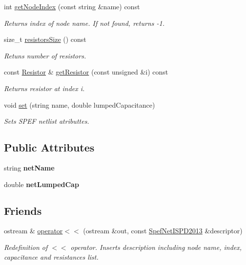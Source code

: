 \begin{DoxyCompactItemize}
int \hyperlink{classSpefNetISPD2013_aa5143da0b98e3fa1613562061238f4ee}{get\-Node\-Index} (const string \&name) const 
\begin{DoxyCompactList}\small\item\em Returns index of node name. If not found, returns -\/1. \end{DoxyCompactList}\item 
size\-\_\-t \hyperlink{classSpefNetISPD2013_a1a15314aec6fae289f90b9e7de201fe8}{resistors\-Size} () const 
\begin{DoxyCompactList}\small\item\em Retuns number of resistors. \end{DoxyCompactList}\item 
const \hyperlink{structSpefNetISPD2013_1_1Resistor}{Resistor} \& \hyperlink{classSpefNetISPD2013_a1baa70cdf4b2c65a7e695849c2ad2525}{get\-Resistor} (const unsigned \&i) const 
\begin{DoxyCompactList}\small\item\em Returns resistor at index i. \end{DoxyCompactList}\item 
void \hyperlink{classSpefNetISPD2013_a3a0ed208b150100bda0544112fb1c0ba}{set} (string name, double lumped\-Capacitance)
\begin{DoxyCompactList}\small\item\em Sets S\-P\-E\-F netlist atributtes. \end{DoxyCompactList}\end{DoxyCompactItemize}
\subsection*{Public Attributes}
\begin{DoxyCompactItemize}
\item 
\hypertarget{classSpefNetISPD2013_a1aa3f32d0cac9a7b1800ab67903361fa}{string {\bfseries net\-Name}}\label{classSpefNetISPD2013_a1aa3f32d0cac9a7b1800ab67903361fa}

\item 
\hypertarget{classSpefNetISPD2013_af088c8d7cbca748a4a56ab796ccb2fd5}{double {\bfseries net\-Lumped\-Cap}}\label{classSpefNetISPD2013_af088c8d7cbca748a4a56ab796ccb2fd5}

\end{DoxyCompactItemize}
\subsection*{Friends}
\begin{DoxyCompactItemize}
\item 
ostream \& \hyperlink{classSpefNetISPD2013_a6a52417a5250abf94d511910add3415e}{operator$<$$<$} (ostream \&out, const \hyperlink{classSpefNetISPD2013}{Spef\-Net\-I\-S\-P\-D2013} \&descriptor)
\begin{DoxyCompactList}\small\item\em Redefinition of $<$$<$ operator. Inserts description including node name, index, capacitance and resistances list. \end{DoxyCompactList}\end{DoxyCompactItemize}


